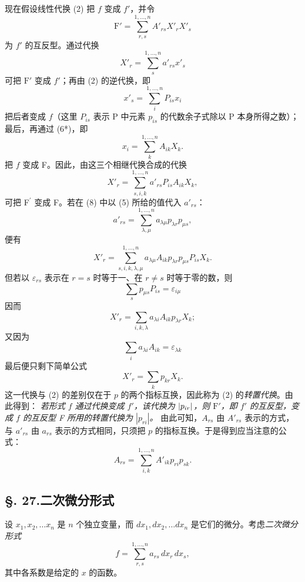 现在假设线性代换 (2) 把 \(f\) 变成 \(f'\)，并令
\[
\mathrm F'=\sum_{r,s}^{1,\ldots,n}A'_{rs}X'_rX'_s
\]
为 \(f'\) 的互反型。通过代换
\[
X'_r=\sum_s^{1,\ldots,n}a'_{rs}x'_s
\]
可把 \(\mathrm F'\) 变成 \(f'\)；再由 (2) 的逆代换，即
\[
x'_s=\sum_i^{1,\ldots,n}P_{is}x_i
\]
把后者变成 \(f\)（这里 \(P_{is}\) 表示 P 中元素 \(p_{is}\) 的代数余子式除以 P 本身所得之数）；最后，再通过 (6*)，即
\[
x_i=\sum_k^{1,\ldots,n}A_{ik}X_k.
\]
把 \(f\) 变成 F。因此，由这三个相继代换合成的代换
\begin{equation}\tag{8}
X'_r=\sum_{s,i,k}^{1,\ldots,n}a'_{rs}P_{is}A_{ik}X_k,
\end{equation}
可把 F\(^{\prime}\) 变成 F。若在 (8) 中以 (5) 所给的值代入 \(a'_{rs}\)：
\[
a'_{rs}=\sum_{\lambda,\mu}^{1,\ldots,n}a_{\lambda\mu}p_{\lambda r}p_{\mu s},
\]
便有
\[
X'_r=\sum_{s,i,k,\lambda,\mu}^{1,\ldots,n}a_{\lambda\mu}A_{ik}p_{\lambda r}p_{\mu s}P_{is}X_k.
\]
但若以 \(\varepsilon_{rs}\) 表示在 \(r=s\) 时等于一、在 \(r\ne s\) 时等于零的数，则
\[
\sum_s p_{\mu s}P_{is}=\varepsilon_{i\mu}
\]
因而
\[
X'_r=\sum_{i,k,\lambda}a_{\lambda i}A_{ik}p_{\lambda r}X_k;
\]
又因为
\[
\sum_i a_{\lambda i}A_{ik}=\varepsilon_{\lambda k}
\]
最后便只剩下简单公式
\begin{equation}\tag{2*}
X'_r=\sum_kp_{kr}X_k.
\end{equation}
这一代换与 (2) 的差别仅在于 \(p\) 的两个指标互换，因此称为 (2) 的\emph{转置代换}。由此得到：
\oldquote
\emph{若形式 \(f\) 通过代换变成 \(f'\)，该代换为 \(\lvert p_{ir}\rvert\)，则 \(\mathrm F'\)，即 \(f'\) 的互反型，变成 \(f\) 的互反型 F 所用的转置代换为 \(|p_{ri}|\)。}
\closeoldquote
{}
由此可知，\(A_{rs}\) 由 \(A'_{rs}\) 表示的方式，与 \(a'_{rs}\) 由 \(a_{rs}\) 表示的方式相同，只须把 \(p\) 的指标互换。于是得到应当注意的公式：
\begin{equation}\tag{9}
A_{rs}=\sum_{i,k}^{1,\ldots,n}A'_{ik}p_{ri}p_{sk}.
\end{equation}

\subsection*{\S. 27.\quad 二次微分形式}
设 \(x_1,x_2,\ldots x_n\) 是 \(n\) 个独立变量，而 \(dx_1,dx_2,\ldots dx_n\) 是它们的微分。考虑\emph{二次微分形式}
\begin{equation}\tag{10}
f=\sum_{r,s}^{1,\ldots,n}a_{rs}\,dx_r\,dx_s,
\end{equation}
其中各系数是给定的 \(x\) 的函数。

